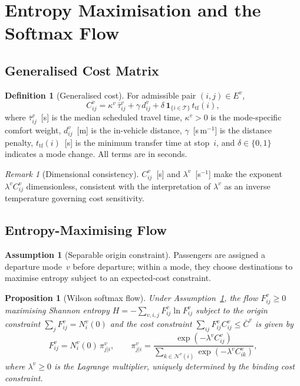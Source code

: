 \documentclass[12pt,a4paper]{article}
\theoremstyle{plain}
\newtheorem{proposition}[theorem]{Proposition}
\theoremstyle{definition}
\newtheorem{definition}[theorem]{Definition}
\newtheorem{assumption}[theorem]{Assumption}
\theoremstyle{remark}
\newtheorem{remark}[theorem]{Remark}
\begin{document}
\section{Entropy Maximisation and the Softmax Flow}
\label{sec:entropy}

\subsection{Generalised Cost Matrix}

\begin{definition}[Generalised cost]
For admissible pair $(i,j)\in E^v$,
\begin{equation}
  C^v_{ij} = \kappa^v\,\bar\tau^v_{ij} + \gamma\,d^v_{ij}
              + \delta\,\mathbf{1}_{\{i\in\mathcal{T}\}}\,t_{\mathrm{tf}}(i),
  \label{eq:cost}
\end{equation}
where $\bar\tau^v_{ij}$~[s] is the median scheduled travel time,
$\kappa^v>0$ is the mode-specific comfort weight,
$d^v_{ij}$~[m] is the in-vehicle distance,
$\gamma$~[s\,m$^{-1}$] is the distance penalty,
$t_{\mathrm{tf}}(i)$~[s] is the minimum transfer time at stop~$i$,
and $\delta\in\{0,1\}$ indicates a mode change.  All terms are in seconds.
\end{definition}

\begin{remark}[Dimensional consistency]
$C^v_{ij}$~[s] and $\lambda^v$~[s$^{-1}$] make the exponent
$\lambda^v C^v_{ij}$ dimensionless, consistent with the interpretation of
$\lambda^v$ as an inverse temperature governing cost sensitivity.
\end{remark}

\subsection{Entropy-Maximising Flow}

\begin{assumption}[Separable origin constraint]
\label{ass:origin}
Passengers are assigned a departure mode~$v$ before departure; within a mode,
they choose destinations to maximise entropy subject to an expected-cost
constraint.
\end{assumption}

\begin{proposition}[Wilson softmax flow]
Under Assumption~\ref{ass:origin}, the flow $F^v_{ij}\ge0$ maximising Shannon
entropy $H=-\sum_{v,i,j}F^v_{ij}\ln F^v_{ij}$ subject to the origin
constraint $\sum_j F^v_{ij}=N^v_i(0)$ and the cost constraint
$\sum_{ij}F^v_{ij}C^v_{ij}\le\bar{C}^v$ is given by
\begin{equation}
  F^v_{ij} = N^v_i(0)\,\pi^v_{j|i},\qquad
  \pi^v_{j|i} = \frac{\exp(-\lambda^v C^v_{ij})}
    {\displaystyle\sum_{k\in\mathcal{N}^v(i)}\exp(-\lambda^v C^v_{ik})},
  \label{eq:softmax}
\end{equation}
where $\lambda^v\ge0$ is the Lagrange multiplier, uniquely determined by the
binding cost constraint.
\end{proposition}
\end{document}
